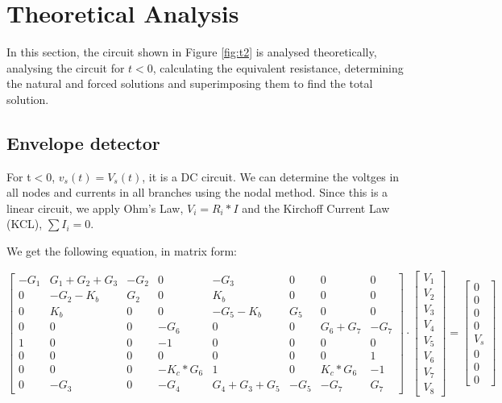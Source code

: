\section{Theoretical Analysis}
\label{sec:analysis}

In this section, the circuit shown in Figure \ref{fig:t2} is analysed
theoretically, analysing the circuit for $t<0$, calculating the equivalent resistance, determining the natural and forced solutions and superimposing them to find the total solution.

\subsection{Envelope detector}
For t$<$0,  $v_s(t)= V_s(t)$,  it is a DC circuit. We can determine the voltges in all nodes and currents in all branches using the nodal method.
Since this is a linear circuit,  we apply Ohm's Law,  $V_i= R_i * I$ and the Kirchoff Current Law (KCL),  $\sum I_i = 0$.

We get the following equation,  in matrix form:

\begin{equation}
\label{eq:matrixeq1}
\begin{bmatrix}
    -G_1 & G_1+G_2+G_3 & -G_2 & 0 & -G_3 & 0 & 0 & 0\\
    0 & -G_2-K_b & G_2 & 0 & K_b & 0 & 0 & 0\\
    0 & K_b & 0 & 0 & -G_5-K_b & G_5 & 0 & 0\\
    0 & 0 & 0 & -G_6 & 0 & 0 & G_6+G_7 & -G_7\\
    1 & 0 & 0 & -1 & 0 & 0 & 0 & 0\\
    0 & 0 & 0 & 0 & 0 & 0 & 0 & 1\\
    0 & 0 & 0 & -K_c*G_6 & 1 & 0 & K_c*G_6 & -1\\
    0 & -G_3 & 0 & -G_4 & G_4+G_3+G_5 & -G_5 & -G_7 & G_7
\end{bmatrix}
\cdot
\begin{bmatrix}
V_1 \\
V_2 \\
V_3 \\
V_4 \\
V_5 \\
V_6 \\
V_7 \\
V_8 
\end{bmatrix}
=
\begin{bmatrix}
0 \\
0 \\
0 \\
0\\
V_s\\
0 \\
0 \\
0
\end{bmatrix}
\end{equation}


